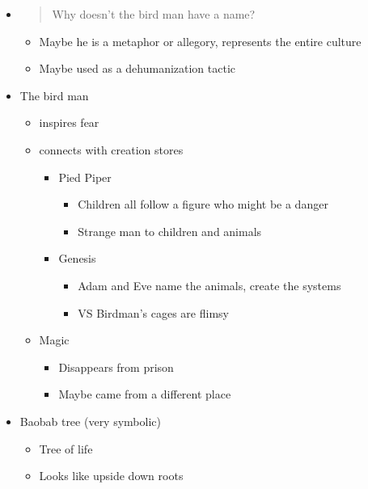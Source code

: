 \documentclass[letterpaper]{article}
\begin{document}
\begin{itemize}
\item \begin{quote}
Why doesn't the bird man have a name?
\end{quote}

\begin{itemize}
\item Maybe he is a metaphor or allegory, represents the entire culture
\item Maybe used as a dehumanization tactic
\end{itemize}

\item The bird man

\begin{itemize}
\item inspires fear
\item connects with creation stores

\begin{itemize}
\item Pied Piper

\begin{itemize}
\item Children all follow a figure who might be a danger
\item Strange man to children and animals
\end{itemize}

\item Genesis

\begin{itemize}
\item Adam and Eve name the animals, create the systems
\item VS Birdman's cages are flimsy
\end{itemize}
\end{itemize}

\item Magic

\begin{itemize}
\item Disappears from prison
\item Maybe came from a different place
\end{itemize}
\end{itemize}

\item Baobab tree (very symbolic)

\begin{itemize}
\item Tree of life
\item Looks like upside down roots


\end{itemize}
\end{itemize}
\end{document}
